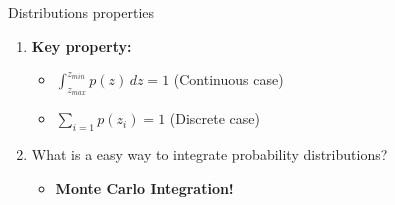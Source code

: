 \documentclass{beamer}
\begin{document}
\begin{frame}{Distributions properties}
\begin{enumerate}

  \item<1->
    
  \textbf{Key property:} 
  \vspace{0.4cm} 
        
  \begin{itemize}
    
  \item $\int_{z_{max}}^{z_{min}} p(z)\, dz = 1$ (Continuous case)
   
  \vspace{0.2cm}   
 
  \item $\sum\limits_{i=1} p(z_{i}) = 1$ (Discrete case)
  
  \vspace{0.2cm} 
  
  \end{itemize} 
  
  \item<2->
  
  What is a easy way to integrate probability distributions?
 
  \begin{itemize}
  
  \item \textbf{Monte Carlo Integration!}  
  
  \end{itemize}    
     
  \vspace{0.2cm}
  
\end{enumerate} 
\end{frame}

\end{document}
